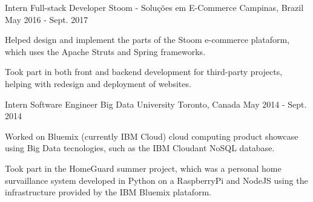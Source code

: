 \begin{cventries}
  \cventry
    {Intern Full-stack Developer} %
    {Stoom - Soluções em E-Commerce} %
    {Campinas, Brazil} %
    {May 2016 - Sept. 2017} %
    {
      \begin{cvitems} %
        \item {Helped design and implement the parts of the Stoom e-commerce plataform, which uses the Apache Struts and Spring frameworks.}
        \item {Took part in both front and backend development for third-party projects, helping with redesign and deployment of websites.}
      \end{cvitems}
    }

  \cventry
    {Intern Software Engineer} %
    {Big Data University} %
    {Toronto, Canada} %
    {May 2014 - Sept. 2014} %
    {
      \begin{cvitems} %
        \item {Worked on Bluemix (currently IBM Cloud) cloud computing product showcase using Big Data tecnologies, such as the IBM Cloudant NoSQL database.}
        \item {Took part in the HomeGuard summer project, which was a personal home survaillance system developed in Python on a RaspberryPi and NodeJS using the infrastructure provided by the IBM Bluemix plataform.}
      \end{cvitems}
    }

\end{cventries}
